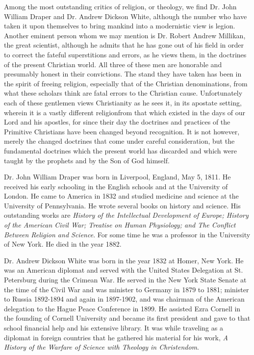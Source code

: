 Among the most outstanding critics of religion, or theology, we find Dr. John William
Draper and Dr. Andrew Dickson White, although the number who have taken it upon
themselves to bring mankind into a modernistic view is legion. Another eminent person
whom we may mention is Dr. Robert Andrew Millikan, the great scientist, although he
admits that he has gone out of his field in order to correct the fateful superstitions and errors,
as he views them, in the doctrines of the present Christian world. All three of these men are
honorable and presumably honest in their convictions. The stand they have taken has been in
the spirit of freeing religion, especially that of the Christian denominations, from what these
scholars think are fatal errors to the Christian cause. Unfortunately each of these gentlemen
views Christianity as he sees it, in its apostate setting, wherein it is a vastly different religionfrom that which existed in the days of our Lord and his apostles, for since their day the
doctrines and practices of the Primitive Christians have been changed beyond recognition. It
is not however, merely the changed doctrines that come under careful consideration, but the
fundamental doctrines which the present world has discarded and which were taught by the
prophets and by the Son of God himself.

Dr. John William Draper was born in Liverpool, England, May 5, 1811. He received his early
schooling in the English schools and at the University of London. He came to America in
1832 and studied medicine and science at the University of Pennsylvania. He wrote several
books on history and science. His outstanding works are \textit{History of the Intellectual
Development of Europe; History of the American Civil War; Treatise on Human Physiology;
and The Conflict Between Religion and Science}. For some time he was a professor in the
University of New York. He died in the year 1882.

Dr. Andrew Dickson White was born in the year 1832 at Homer, New York. He was an
American diplomat and served with the United States Delegation at St. Petersburg during the
Crimean War. He served in the New York State Senate at the time of the Civil War and was
minister to Germany in 1879 to 1881; minister to Russia 1892-1894 and again in 1897-1902,
and was chairman of the American delegation to the Hague Peace Conference in 1899. He
assisted Ezra Cornell in the founding of Cornell University and became its first president and
gave to that school financial help and his extensive library. It was while traveling as a
diplomat in foreign countries that he gathered his material for his work, \textit{A History of the
Warfare of Science with Theology in Christendom}.

